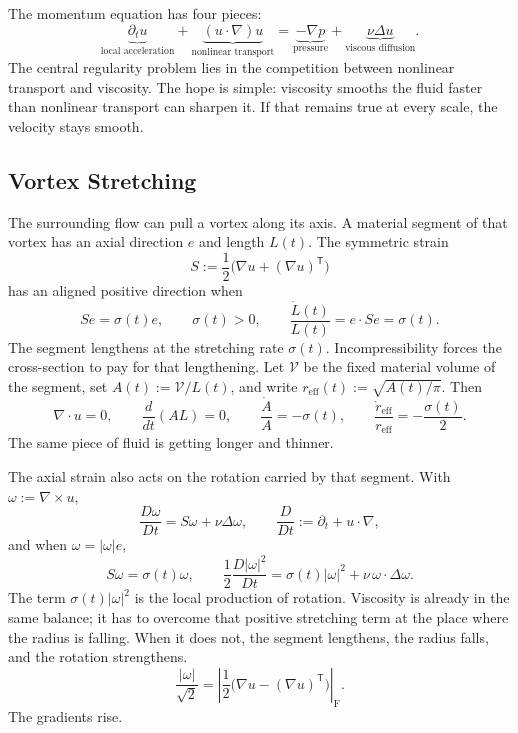 
The momentum equation has four pieces:
\[
  \underbrace{\partial_t u}_{\text{local acceleration}}
  +
  \underbrace{(u\cdot\nabla)u}_{\text{nonlinear transport}}
  =
  \underbrace{-\nabla p}_{\text{pressure}}
  +
  \underbrace{\nu\Delta u}_{\text{viscous diffusion}}.
\]
The central regularity problem lies in the competition between nonlinear transport and viscosity.
The hope is simple: viscosity smooths the fluid faster than nonlinear transport can sharpen it.
If that remains true at every scale, the velocity stays smooth.

\subsection{Vortex Stretching}\label{sub:ThePerfectlyStretchingVortex}

The surrounding flow can pull a vortex along its axis.
A material segment of that vortex has an axial direction \(e\) and length \(L(t)\).
The symmetric strain
\[
  S:=\frac12\bigl(\nabla u+(\nabla u)^{\mathsf T}\bigr)
\]
has an aligned positive direction when
\[
  Se=\sigma(t)e,
  \qquad
  \sigma(t)>0,
  \qquad
  \frac{\dot L(t)}{L(t)}
  =
  e\cdot Se
  =
  \sigma(t).
\]
The segment lengthens at the stretching rate \(\sigma(t)\).
Incompressibility forces the cross-section to pay for that lengthening.
Let \(\mathcal V\) be the fixed material volume of the segment, set \(A(t):=\mathcal V/L(t)\), and write \(r_{\mathrm{eff}}(t):=\sqrt{A(t)/\pi}\).
Then
\[
  \nabla\cdot u=0,
  \qquad
  \frac{d}{dt}(A L)=0,
  \qquad
  \frac{\dot A}{A}=-\sigma(t),
  \qquad
  \frac{\dot r_{\mathrm{eff}}}{r_{\mathrm{eff}}}
  =
  -\frac{\sigma(t)}{2}.
\]
The same piece of fluid is getting longer and thinner.

The axial strain also acts on the rotation carried by that segment.
With \(\omega:=\nabla\times u\),
\[
  \frac{D\omega}{Dt}
  =
  S\omega+\nu\Delta\omega,
  \qquad
  \frac{D}{Dt}
  :=
  \partial_t+u\cdot\nabla,
\]
and when \(\omega=|\omega|e\),
\[
  S\omega
  =
  \sigma(t)\omega,
  \qquad
  \frac12\frac{D|\omega|^2}{Dt}
  =
  \sigma(t)|\omega|^2
  +
  \nu\,\omega\cdot\Delta\omega.
\]
The term \(\sigma(t)|\omega|^2\) is the local production of rotation.
Viscosity is already in the same balance; it has to overcome that positive stretching term at the place where the radius is falling.
When it does not, the segment lengthens, the radius falls, and the rotation strengthens.
\[
  \frac{|\omega|}{\sqrt2}
  =
  \left|\frac12\bigl(\nabla u-(\nabla u)^{\mathsf T}\bigr)\right|_{\mathrm F}.
\]
The gradients rise.

